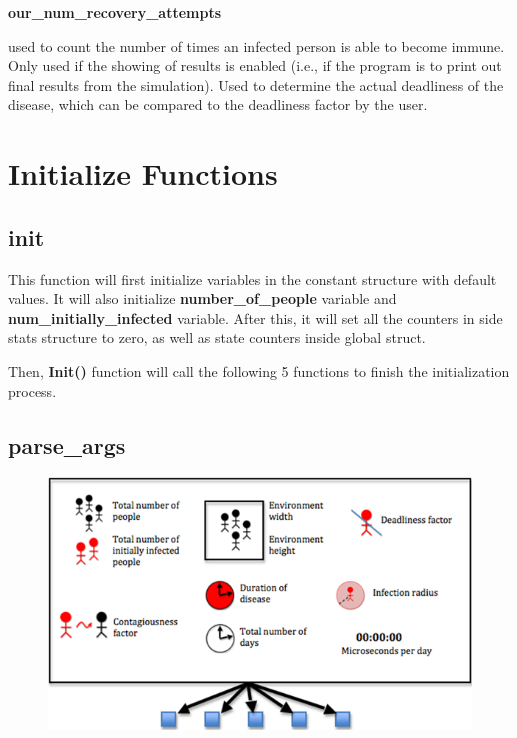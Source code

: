 \documentclass[letterpaper,10pt,openany,oneside]{sphinxmanual}
\begin{document}
\textbf{our\_num\_recovery\_attempts}

used to count the number of times an
infected person is able to become immune. Only used if the showing of
results is enabled (i.e., if the program is to print out final results
from the simulation). Used to determine the actual deadliness of the
disease, which can be compared to the deadliness factor by the user.


\chapter{Initialize Functions}
\label{3-Initialize/initialize:initialize-functions}\label{3-Initialize/initialize::doc}

\section{init}
\label{3-Initialize/initialize:init}
This function will first initialize variables in the constant structure with default values. It will also initialize \textbf{number\_of\_people} variable and \textbf{num\_initially\_infected} variable. After this, it will set all the counters in side stats structure to zero, as well as state counters inside global struct.

Then, \textbf{Init()} function will call the following 5 functions to finish the initialization process.


\section{parse\_args}
\label{3-Initialize/initialize:parse-args}\begin{figure}[htbp]
\centering

\includegraphics{img-6.png}
\end{figure}
\end{document}
